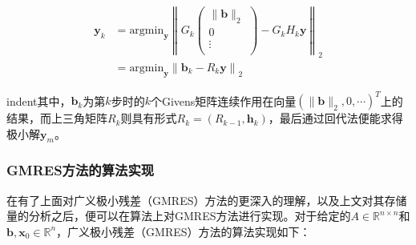 \documentclass[UTF8,nofonts]{ctexart}
\begin{document}
\begin{equation}
\begin{aligned}
	\boldsymbol{y}_k &= \text{argmin}_{\boldsymbol{y}}
	\left\|
		G_k
		\begin{pmatrix}
			\|\boldsymbol{b}\|_2 \\ 0 \\ \vdots \\
		\end{pmatrix}
		-G_kH_k\boldsymbol{y}
	\right\|_2 \\ &= \text{argmin}_{\boldsymbol{y}}
	\left\|
		\boldsymbol{b}_k-R_k\boldsymbol{y}
	\right\|_2
\end{aligned}
\end{equation}

indent其中，$\boldsymbol{b}_k$为第$k$步时的$k$个Givens矩阵连续作用在向量$(\|\boldsymbol{b}\|_2,0,\cdots)^T$上的结果，而上三角矩阵$R_k$则具有形式$R_k=(R_{k-1},\boldsymbol{h}_k)$，最后通过回代法便能求得极小解$\boldsymbol{y}_m$。

\subsubsection*{GMRES方法的算法实现}
\label{subs:GMRES方法的算法实现}

在有了上面对广义极小残差（GMRES）方法的更深入的理解，以及上文对其存储量的分析之后，便可以在算法上对GMRES方法进行实现。对于给定的$A\in\mathbb{R}^{n \times n}$和$\boldsymbol{b},\boldsymbol{x}_0\in\mathbb{R}^n$，广义极小残差（GMRES）方法的算法实现如下：
\end{document}

